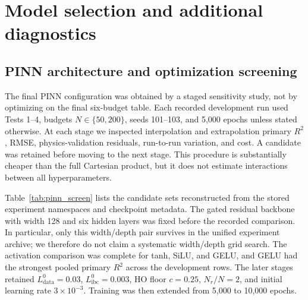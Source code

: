 \section{Model selection and additional diagnostics}

\subsection{PINN architecture and optimization screening}
\label{app:tuning}

The final PINN configuration was obtained by a staged sensitivity study, not by optimizing on the final six-budget table. Each recorded development run used Tests 1--4, budgets \(N\in\{50,200\}\), seeds 101--103, and 5,000 epochs unless stated otherwise. At each stage we inspected interpolation and extrapolation primary \(R^2\), RMSE, physics-validation residuals, run-to-run variation, and cost. A candidate was retained before moving to the next stage. This procedure is substantially cheaper than the full Cartesian product, but it does not estimate interactions between all hyperparameters.

Table~\ref{tab:pinn_screen} lists the candidate sets reconstructed from the stored experiment namespaces and checkpoint metadata. The gated residual backbone with width 128 and six hidden layers was fixed before the recorded comparison. In particular, only this width/depth pair survives in the unified experiment archive; we therefore do not claim a systematic width/depth grid search. The activation comparison was complete for tanh, SiLU, and GELU, and GELU had the strongest pooled primary \(R^2\) across the development rows. The later stages retained \(L^0_{\mathrm{data}}=0.03\), \(L^0_{\mathrm{ibc}}=0.003\), HO floor \(c=0.25\), \(N_r/N=2\), and initial learning rate \(3\times10^{-3}\). Training was then extended from 5,000 to 10,000 epochs.

